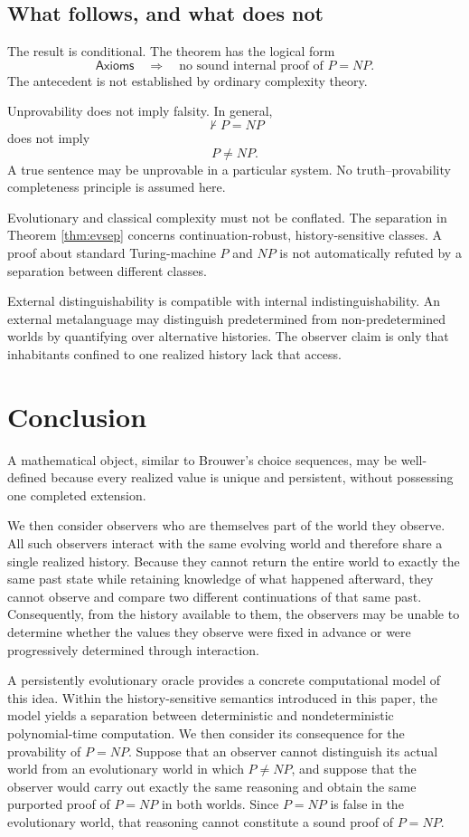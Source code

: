 \documentclass[11pt]{article}
\begin{document}
\subsection{What follows, and what does not}

The result is conditional.
The theorem has the logical form
\[
\mathsf{Axioms}
\quad\Longrightarrow\quad
\text{no sound internal proof of }P=NP.
\]
The antecedent is not established by ordinary complexity theory.

 Unprovability does not imply falsity.
In general,
\[
\nvdash P=NP
\]
does not imply
\[
P\neq NP.
\]
A true sentence may be unprovable in a particular system.  No truth--provability completeness
principle is assumed here.

 Evolutionary and classical complexity must not be conflated.
The separation in Theorem \ref{thm:evsep} concerns continuation-robust, history-sensitive classes.
A proof about standard Turing-machine \(P\) and \(NP\) is not automatically refuted by a
separation between different classes.  

 External distinguishability is compatible with internal indistinguishability.
An external metalanguage may distinguish predetermined from non-predetermined worlds by
quantifying over alternative histories.  The observer claim is only that inhabitants confined
to one realized history lack that access.





\section{Conclusion}

A mathematical object, similar to Brouwer's choice
sequences, may be well-defined because every realized value is unique and
persistent, without possessing one completed extension.
 

We then consider observers who are themselves part of the world they observe. All such observers interact with the same evolving world and therefore share a single realized history. Because they cannot return the entire world to exactly the same past state while retaining knowledge of what happened afterward, they cannot observe and compare two different continuations of that same past. Consequently, from the history available to them, the observers may be unable to determine whether the values they observe were fixed in advance or were progressively determined through interaction.

A persistently evolutionary oracle provides a concrete computational model of this idea. Within the history-sensitive semantics introduced in this paper, the model yields a separation between deterministic and nondeterministic polynomial-time computation. We then consider its consequence for the provability of \(P=NP\). Suppose that an observer cannot distinguish its actual world from an evolutionary world in which \(P\neq NP\), and suppose that the observer would carry out exactly the same reasoning and obtain the same purported proof of \(P=NP\) in both worlds. Since \(P=NP\) is false in the evolutionary world, that reasoning cannot constitute a sound proof of \(P=NP\).
\end{document}
